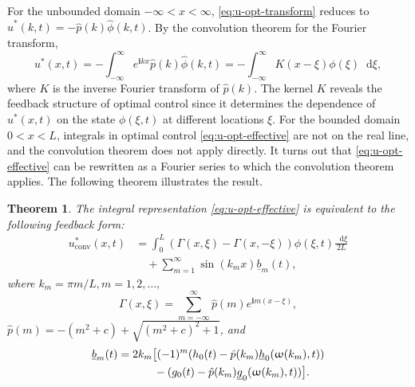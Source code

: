 \documentclass[journal,twoside,web]{ieeecolor}
\newtheorem{theorem}{Theorem}
\newcommand{\state}{\phi}
\newcommand{\statehat}{\hat{\state}}
\newcommand{\im}{\mathbf{i}}
\newcommand*\diff{\mathop{}\!\mathrm{d}}
\newcommand{\wcomplex}{\upomega}
\begin{document}
For the unbounded domain $-\infty<x<\infty$, \eqref{eq:u-opt-transform} reduces to $\hat{u}^*(k,t) = -\hat{p}(k)\statehat(k,t)$. By the convolution theorem for the Fourier transform, 
$$u^*(x,t)= -\int_{-\infty}^{\infty}e^{\im k x} \hat{p}(k)\statehat(k,t) = -\int_{-\infty}^{\infty}K(x-\xi)\state(\xi)\diff \xi,$$ 
where $K$ is the inverse Fourier transform of $\hat{p}(k)$.
The kernel $K$ reveals the feedback structure of optimal control since it determines the dependence of $u^*(x,t)$ on the state $\state(\xi,t)$ at different locations $\xi$.
For the bounded domain $0<x<L$, integrals in optimal control \eqref{eq:u-opt-effective} are not on the real line, and the convolution theorem does not apply directly.
It turns out that \eqref{eq:u-opt-effective} can be rewritten as a Fourier series to which the convolution theorem applies. The following theorem illustrates the result.

\begin{theorem}
	The integral representation \eqref{eq:u-opt-effective} is equivalent to the following feedback form:
	\begin{equation}\label{eq:u-opt-convolution}
		\begin{aligned}
			u^*_{\text{conv}}(x,t) &= \int_{0}^{L}\left(\Gamma(x,\xi) - \Gamma(x,-\xi)\right)\state(\xi,t)\frac{\diff \xi}{2L} \\
									&\quad + \sum_{m=1}^{\infty}\sin(k_m x)\underline{b}_m(t),
		\end{aligned}
	\end{equation}
	where $k_m = \pi m/L,m=1,2,\ldots,$
	\begin{equation}\label{eq:Gamma-convolution}
		\Gamma(x,\xi) = \sum_{m=-\infty}^{\infty}\hat{p}(m)e^{\im m(x-\xi)},
	\end{equation}
	$\hat{p}(m) = - (m^2+c) + \sqrt{(m^2+c)^2 + 1}$, and
	\begin{equation}\label{eq:underline-bn}
		\begin{aligned}
			\underline{b}_m(t) &= 2k_m\big[(-1)^m(h_0(t)-\hat{p}(k_m)\underline{h}_0(\wcomplex(k_m),t))\\
			&\hspace{0.45in} -(g_0(t)-\hat{p}(k_m)\underline{g}_0(\wcomplex(k_m),t))\big].
		\end{aligned}
	\end{equation}
\end{theorem}	
\end{document}
